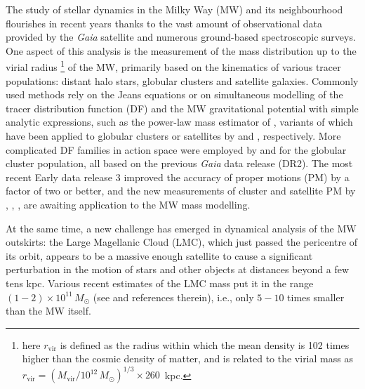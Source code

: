 \documentclass[usenatbib,fleqn]{mnras}
\newcommand{\Gaia}{\textit{Gaia}\xspace}
\begin{document}
The study of stellar dynamics in the Milky Way (MW) and its neighbourhood flourishes in recent years thanks to the vast amount of observational data provided by the \Gaia satellite and numerous ground-based spectroscopic surveys. One aspect of this analysis is the measurement of the mass distribution up to the virial radius%
\footnote{here $r_\text{vir}$ is defined as the radius within which the mean density is 102 times higher than the cosmic density of matter, and is related to the virial mass as $r_\text{vir} = (M_\text{vir}/10^{12}\,M_\odot)^{1/3} \times 260$~kpc.}
of the MW, primarily based on the kinematics of various tracer populations: distant halo stars, globular clusters and satellite galaxies. Commonly used methods rely on the Jeans equations or on simultaneous modelling of the tracer distribution function (DF) and the MW gravitational potential with simple analytic expressions, such as the power-law mass estimator of \citet{Watkins2010}, variants of which have been applied to globular clusters or satellites by \citet{Eadie2019} and \citet{Fritz2020}, respectively. More complicated DF families in action space were employed by \citet{Posti2019} and \citet{Vasiliev2019b} for the globular cluster population, all based on the previous \Gaia data release (DR2). The most recent Early data release 3 \citep{Brown2021} improved the accuracy of proper motions (PM) by a factor of two or better, and the new measurements of cluster and satellite PM by \citet{Vasiliev2021a}, \citet{McConnachie2020}, \citet{Li2021}, \citet{Battaglia2021} are awaiting application to the MW mass modelling.

At the same time, a new challenge has emerged in dynamical analysis of the MW outskirts: the Large Magellanic Cloud (LMC), which just passed the pericentre of its orbit, appears to be a massive enough satellite to cause a significant perturbation in the motion of stars and other objects at distances beyond a few tens kpc. Various recent estimates of the LMC mass put it in the range $(1-2)\times 10^{11}\,M_\odot$ (see \citealt{Shipp2021} and references therein), i.e., only $5-10$ times smaller than the MW itself.
\end{document}
